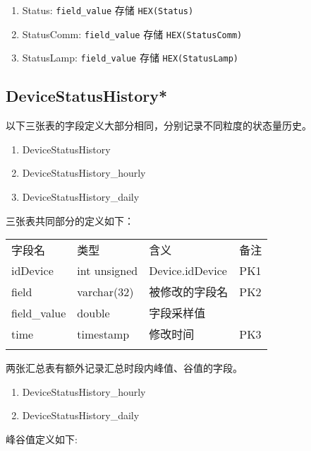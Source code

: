 \begin{enumerate}
\def\labelenumi{\arabic{enumi}.}
\itemsep1pt\parskip0pt
\item
  Status: \texttt{field\_value} 存储 \texttt{HEX(Status)}
\item
  StatusComm: \texttt{field\_value} 存储 \texttt{HEX(StatusComm)}
\item
  StatusLamp: \texttt{field\_value} 存储 \texttt{HEX(StatusLamp)}
\end{enumerate}

\subsection{DeviceStatusHistory*}\label{devicestatushistory}

以下三张表的字段定义大部分相同，分别记录不同粒度的状态量历史。

\begin{enumerate}
\def\labelenumi{\arabic{enumi}.}
\itemsep1pt\parskip0pt
\item
  DeviceStatusHistory
\item
  DeviceStatusHistory\_hourly
\item
  DeviceStatusHistory\_daily
\end{enumerate}

三张表共同部分的定义如下：

\begin{longtabu}[c]{@{}lXXX@{}}
\toprule\addlinespace
字段名 & 类型 & 含义 & 备注
\\\addlinespace
\midrule\endhead
idDevice & int unsigned & Device.idDevice & PK1
\\\addlinespace
field & varchar(32) & 被修改的字段名 & PK2
\\\addlinespace
field\_value & double & 字段采样值 &
\\\addlinespace
time & timestamp & 修改时间 & PK3
\\\addlinespace
\bottomrule
\end{longtabu}

两张汇总表有额外记录汇总时段内峰值、谷值的字段。

\begin{enumerate}
\def\labelenumi{\arabic{enumi}.}
\itemsep1pt\parskip0pt
\item
  DeviceStatusHistory\_hourly
\item
  DeviceStatusHistory\_daily
\end{enumerate}

峰谷值定义如下:

